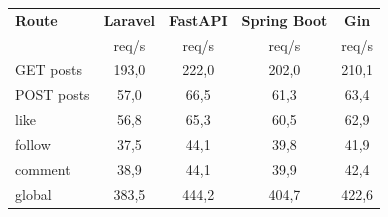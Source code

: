 \begin{tabular}{@{}lcccc@{}}
\toprule
\textbf{Route} & \textbf{Laravel} & \textbf{FastAPI} & \textbf{Spring Boot} & \textbf{Gin} \\
 & req/s & req/s & req/s & req/s \\
\midrule
GET posts & 193,0 & 222,0 & 202,0 & 210,1 \\
POST posts & 57,0 & 66,5 & 61,3 & 63,4 \\
like & 56,8 & 65,3 & 60,5 & 62,9 \\
follow & 37,5 & 44,1 & 39,8 & 41,9 \\
comment & 38,9 & 44,1 & 39,9 & 42,4 \\
global & 383,5 & 444,2 & 404,7 & 422,6 \\
\bottomrule
\end{tabular}
